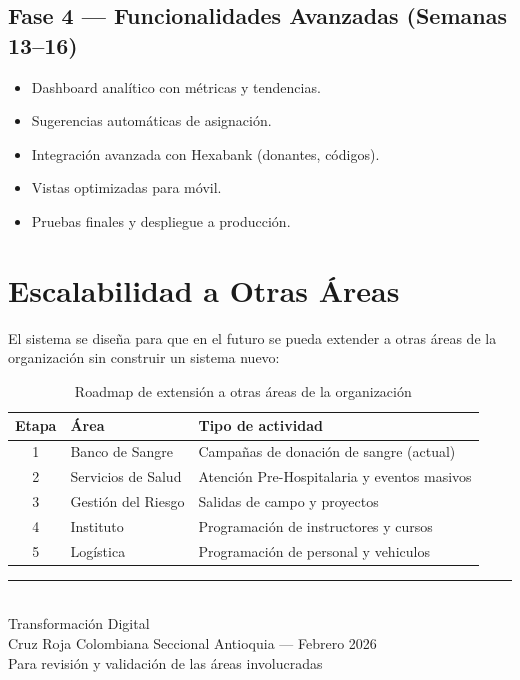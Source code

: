 \documentclass[9pt,a4paper]{extarticle}
\begin{document}
\subsection{Fase 4 --- Funcionalidades Avanzadas (Semanas 13--16)}

\begin{itemize}[leftmargin=2em]
    \item Dashboard anal\'{i}tico con m\'{e}tricas y tendencias.
    \item Sugerencias autom\'{a}ticas de asignaci\'{o}n.
    \item Integraci\'{o}n avanzada con Hexabank (donantes, c\'{o}digos).
    \item Vistas optimizadas para m\'{o}vil.
    \item Pruebas finales y despliegue a producci\'{o}n.
\end{itemize}

\newpage
\section{Escalabilidad a Otras \'{A}reas}

El sistema se diseña para que en el futuro se pueda extender a otras \'{a}reas de la organizaci\'{o}n sin construir un sistema nuevo:

\begin{table}[h!]
\centering
\begin{tabularx}{\textwidth}{|c|l|X|}
\hline
\textbf{Etapa} & \textbf{\'{A}rea} & \textbf{Tipo de actividad} \\
\hline
1 & Banco de Sangre & Campañas de donaci\'{o}n de sangre (actual) \\
\hline
2 & Servicios de Salud & Atenci\'{o}n Pre-Hospitalaria y eventos masivos\\
\hline
3 & Gesti\'{o}n del Riesgo & Salidas de campo y proyectos \\
\hline
4 & Instituto & Programaci\'{o}n de instructores y cursos \\
\hline
5 & Log\'{i}stica & Programaci\'{o}n de personal y vehiculos \\
\hline
\end{tabularx}
\caption{Roadmap de extensi\'{o}n a otras \'{a}reas de la organizaci\'{o}n}
\end{table}

\vfill

\begin{center}
    {\color{azuloscuro}\rule{0.5\textwidth}{1pt}}\\[0.5cm]
    {\small\color{grisoscuro} Transformaci\'{o}n Digital\\
    Cruz Roja Colombiana Seccional Antioquia --- Febrero 2026\\
    Para revisi\'{o}n y validaci\'{o}n de las \'{a}reas involucradas}
\end{center}
\end{document}

